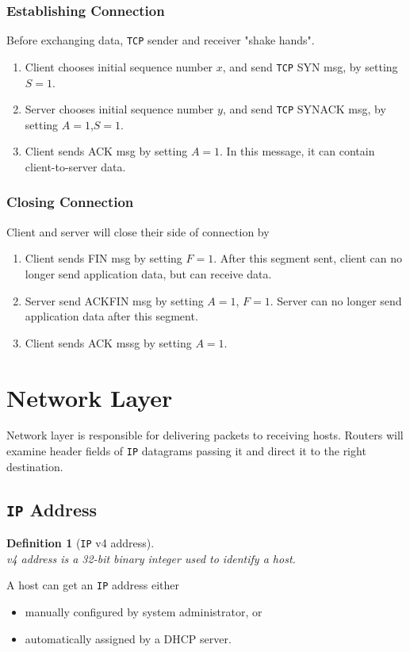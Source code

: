 \documentclass[12pt]{article}
\newcommand\TCP{\texttt{TCP} }
\newcommand\IP{\texttt{IP} }
\newtheorem{definition}{Definition}[section]
\theoremstyle{definition}
\begin{document}
  \subsubsection{Establishing Connection}
  Before exchanging data, \TCP sender and receiver "shake hands".
  \begin{enumerate}
    \item Client chooses initial sequence number $x$, and send \TCP SYN msg, by setting $S= 1$.
    \item Server chooses initial sequence number $y$, and send \TCP SYNACK msg, by setting $A = 1$,$S=1$.
    \item Client sends ACK msg by setting $A=1$. In this message, it can contain client-to-server data.
  \end{enumerate}
  \subsubsection{Closing Connection}
  Client and server will close their side of connection by
  \begin{enumerate}
    \item Client sends FIN msg by setting $F=1$. After this segment sent, client can no longer send application data, but can receive data.
    \item Server send ACKFIN msg by setting $A = 1$, $F = 1$. Server can no longer send application data after this segment.
    \item Client sends ACK mssg by setting $A = 1$.
  \end{enumerate}
  \clearpage
\section{Network Layer}
Network layer is responsible for delivering packets to receiving hosts. Routers will examine header fields of \IP datagrams passing it and direct it to the right destination.
\subsection{\IP Address}

\begin{definition}[{\IP}v4 address]
\hfill\\\normalfont {\IP}v4 address is a 32-bit binary integer used to identify a host.
\end{definition}
A host can get an \IP address either
\begin{itemize}
  \item manually configured by system administrator, or
  \item automatically assigned by a DHCP server.
\end{itemize}
\end{document}
